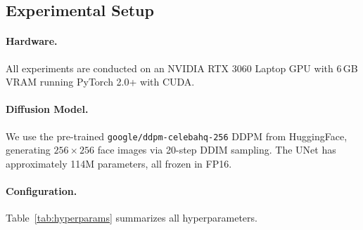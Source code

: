 \documentclass[10pt, twocolumn]{article}
\begin{document}
\subsection{Experimental Setup}
\label{sec:setup}

\paragraph{Hardware.}
All experiments are conducted on an NVIDIA RTX 3060 Laptop GPU with 6\,GB VRAM running PyTorch 2.0+ with CUDA.

\paragraph{Diffusion Model.}
We use the pre-trained \texttt{google/ddpm-celebahq-256} DDPM from HuggingFace, generating $256\times256$ face images via 20-step DDIM sampling.
The UNet has approximately 114M parameters, all frozen in FP16.

\paragraph{Configuration.}
Table~\ref{tab:hyperparams} summarizes all hyperparameters.
\end{document}
